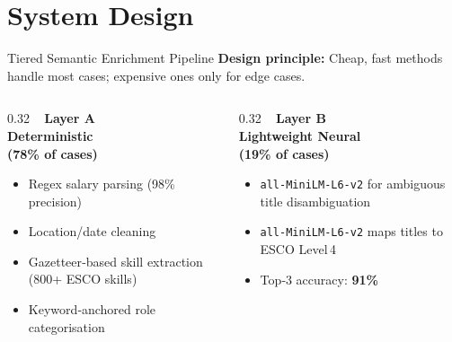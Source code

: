 \documentclass[aspectratio=169, 10pt]{beamer}
\begin{document}
    \section{System Design}

    \begin{frame}{Tiered Semantic Enrichment Pipeline}
        \textbf{Design principle:} Cheap, fast methods handle most cases; expensive ones only for edge cases.
        \vspace{0.5cm}

        \begin{columns}[T]
            \begin{column}{0.32\textwidth}
                \centering
                \textcolor{myteal}{\faCheckCircle~ \textbf{Layer A}} \\
                \textcolor{myteal}{\textbf{Deterministic}} \\
                \textcolor{myteal}{\textbf{(78\% of cases)}}
                \vspace{0.2cm}

                \begin{itemize}
                    \item Regex salary parsing (98\% precision)
                    \item Location/date cleaning
                    \item Gazetteer‑based skill extraction (800+ ESCO skills)
                    \item Keyword‑anchored role categorisation
                \end{itemize}
            \end{column}

            \begin{column}{0.32\textwidth}
                \centering
                \textcolor{myaccent}{\faBrain~ \textbf{Layer B}} \\
                \textcolor{myaccent}{\textbf{Lightweight Neural}} \\
                \textcolor{myaccent}{\textbf{(19\% of cases)}}
                \vspace{0.2cm}

                \begin{itemize}
                    \item \texttt{all-MiniLM-L6-v2} for ambiguous title disambiguation
                    \item \texttt{all-MiniLM-L6-v2} maps titles to ESCO Level 4
\item Top‑3 accuracy: \textbf{91\%}
\end{itemize}
\end{column}


\end{columns}
\end{frame}
\end{document}
